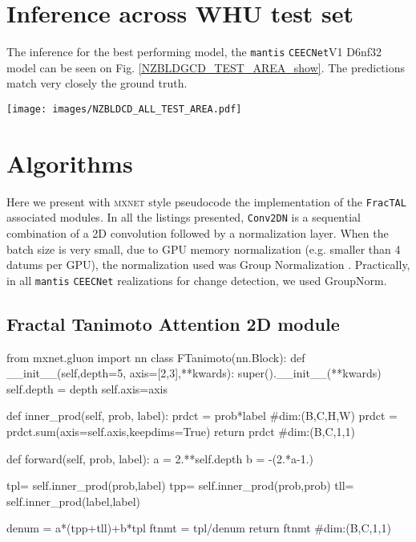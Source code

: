 \documentclass[times, 5p]{elsarticle}
\def \FracTAL {\texttt{FracTAL} }
\newcommand{\ceecnet}{\texttt{CEECNet}}
\newcommand{\mantis}{\texttt{mantis}}
\begin{document}
\section{Inference across WHU test set}

The inference for the best performing model, the \mantis{} \ceecnet V1 D6nf32 model can be seen on Fig. \ref{NZBLDGCD_TEST_AREA_show}. The predictions match very closely the ground truth. 

\begin{figure*}
\centering
\texttt{[image: images/NZBLDCD\_ALL\_TEST\_AREA.pdf]}
\caption{Inference across the whole test area over NZBLDG CD Dataset using the \mantis{}\ceecnet V1 D6nf32 model. From left to right: 2011 input image, 2016 input image, ground truth, prediction (threshold 0.5) and confidence heat map.} 
\label{NZBLDGCD_TEST_AREA_show}
\end{figure*}


\section{Algorithms}
\label{section_algorithms}
Here we present with \textsc{mxnet} style pseudocode the implementation of the \FracTAL associated modules. In all the listings presented, \texttt{Conv2DN} is a sequential combination of a 2D convolution followed by a normalization layer. When the batch size is very small, due to GPU memory normalization (e.g. smaller than 4 datums per GPU), the normalization used was Group Normalization \cite{DBLP:journals/corr/abs-1803-08494}. Practically, in all \mantis{} \ceecnet{} realizations for change detection, we used GroupNorm. 

\subsection{Fractal Tanimoto Attention 2D module}

\begin{python}[emphstyle=\textcolor{magenta}, caption={\textsc{mxnet/gluon} style pseudo code for the fractal Tanimoto coefficient, predefined for spatial similarity.}, emph={FTanimoto,forward,__init__,inner_prod},label={FTanimotoCODE}]
from mxnet.gluon import nn
class FTanimoto(nn.Block):
    def __init__(self,depth=5, axis=[2,3],**kwards):
        super().__init__(**kwards)
        self.depth = depth
        self.axis=axis

    def inner_prod(self, prob, label):
        prdct = prob*label #dim:(B,C,H,W)
        prdct = prdct.sum(axis=self.axis,keepdims=True)
        return prdct #dim:(B,C,1,1)

    def forward(self, prob, label):
        a = 2.**self.depth
        b = -(2.*a-1.)

        tpl= self.inner_prod(prob,label)
        tpp= self.inner_prod(prob,prob)
        tll= self.inner_prod(label,label)
        
        denum = a*(tpp+tll)+b*tpl
        ftnmt = tpl/denum
        return ftnmt #dim:(B,C,1,1)
\end{python}
\end{document}
